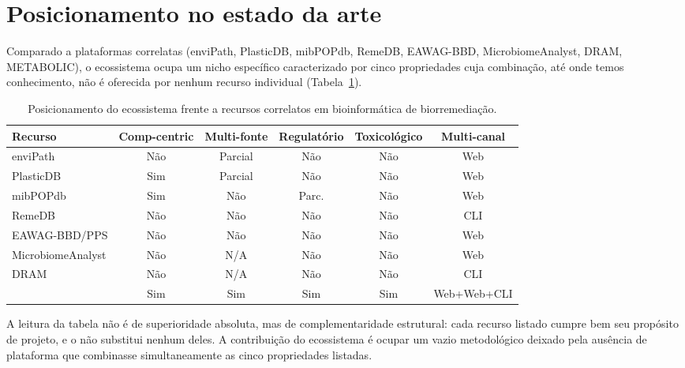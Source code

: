 \section{Posicionamento no estado da arte}
\label{sec:c7-posicionamento}

Comparado a plataformas correlatas (enviPath, PlasticDB, mibPOPdb, RemeDB, EAWAG-BBD, MicrobiomeAnalyst, DRAM, METABOLIC), o ecossistema \biorempp{} ocupa um nicho específico caracterizado por cinco propriedades cuja combinação, até onde temos conhecimento, não é oferecida por nenhum recurso individual (Tabela~\ref{tab:c7-comparacao}).

\begin{table}[htbp]
\centering
\caption{Posicionamento do ecossistema \biorempp{} frente a recursos correlatos em bioinformática de biorremediação.}
\label{tab:c7-comparacao}
\small
\begin{tabular}{@{}lccccc@{}}
\toprule
\textbf{Recurso} & \textbf{Comp-centric} & \textbf{Multi-fonte} & \textbf{Regulatório} & \textbf{Toxicológico} & \textbf{Multi-canal} \\
\midrule
enviPath        & Não & Parcial & Não & Não & Web \\
PlasticDB       & Sim & Parcial & Não & Não & Web \\
mibPOPdb        & Sim & Não     & Parc. & Não & Web \\
RemeDB          & Não & Não     & Não & Não & CLI \\
EAWAG-BBD/PPS   & Não & Não     & Não & Não & Web \\
MicrobiomeAnalyst & Não & N/A   & Não & Não & Web \\
DRAM            & Não & N/A     & Não & Não & CLI \\
\biorempp{}     & Sim & Sim     & Sim & Sim & Web+Web+CLI \\
\bottomrule
\end{tabular}
\end{table}

A leitura da tabela não é de superioridade absoluta, mas de complementaridade estrutural: cada recurso listado cumpre bem seu propósito de projeto, e o \biorempp{} não substitui nenhum deles. A contribuição do ecossistema \biorempp{} é ocupar um vazio metodológico deixado pela ausência de plataforma que combinasse simultaneamente as cinco propriedades listadas.

